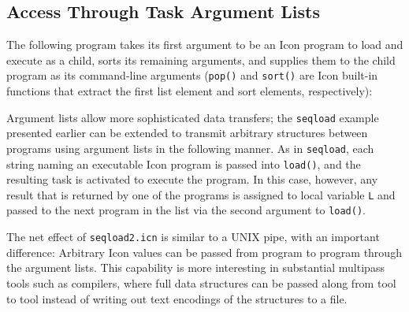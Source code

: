 


\subsection{Access Through Task Argument Lists}

The following program takes its first argument to be an Icon program
to load and execute as a child, sorts its remaining arguments, and
supplies them to the child program as its command-line arguments
({\tt pop()} and {\tt sort()} are Icon built-in functions that extract
the first list element and sort elements, respectively):


Argument lists allow more sophisticated data transfers; the {\tt seqload} 
example presented earlier can be extended to transmit arbitrary
structures between programs using argument lists in the following
manner.  As in {\tt seqload}, each string naming an executable Icon
program is passed into {\tt load()}, and the resulting task is
activated to execute the program.  In this case, however, any result
that is returned by one of the programs is assigned to local variable
{\tt L} and passed to the next program in the list via the second
argument to {\tt load()}.


The net effect of {\tt seqload2.icn} is similar to a UNIX pipe, with
an important difference: Arbitrary Icon values can be passed from
program to program through the argument lists.
This capability is more interesting in substantial multipass tools
such as compilers, where full data structures can be passed along from
tool to tool instead of writing out text encodings of the structures
to a file.


